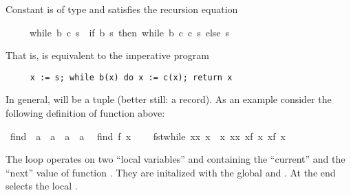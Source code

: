 \begin{isabellebody}
\begin{isamarkuptext}
Constant  is of type 
and satisfies the recursion equation \begin{isabelle}%
\ \ \ \ \ while\ b\ c\ s\ {\isacharequal}\ {\isacharparenleft}if\ b\ s\ then\ while\ b\ c\ {\isacharparenleft}c\ s{\isacharparenright}\ else\ s{\isacharparenright}%
\end{isabelle}
That is,  is equivalent to the imperative program
\begin{verbatim}
     x := s; while b(x) do x := c(x); return x
\end{verbatim}
In general,  will be a tuple (better still: a record). As an example
consider the following definition of function  above:%
\end{isamarkuptext}%
\ find{}\ {\isacharcolon}{\isacharcolon}\ {\isachardoublequote}{\isacharparenleft}{\isacharprime}a\ {\isasymRightarrow}\ {\isacharprime}a{\isacharparenright}\ {\isasymRightarrow}\ {\isacharprime}a\ {\isasymRightarrow}\ {\isacharprime}a{\isachardoublequote}\isanewline
\ \ {\isachardoublequote}find{}\ f\ x\ {\isasymequiv}\isanewline
\ \ \ fst{\isacharparenleft}while\ {\isacharparenleft}{\isasymlambda}{\isacharparenleft}x{\isacharcomma}x{\isacharprime}{\isacharparenright}{\isachardot}\ x{\isacharprime}\ {\isasymnoteq}\ x{\isacharparenright}\ {\isacharparenleft}{\isasymlambda}{\isacharparenleft}x{\isacharcomma}x{\isacharprime}{\isacharparenright}{\isachardot}\ {\isacharparenleft}x{\isacharprime}{\isacharcomma}f\ x{\isacharprime}{\isacharparenright}{\isacharparenright}\ {\isacharparenleft}x{\isacharcomma}f\ x{\isacharparenright}{\isacharparenright}{\isachardoublequote}%
\begin{isamarkuptext}%
\noindent
The loop operates on two ``local variables''  and 
containing the ``current'' and the ``next'' value of function .
They are initalized with the global  and . At the
end  selects the local .


\end{isamarkuptext}
\end{isabellebody}
